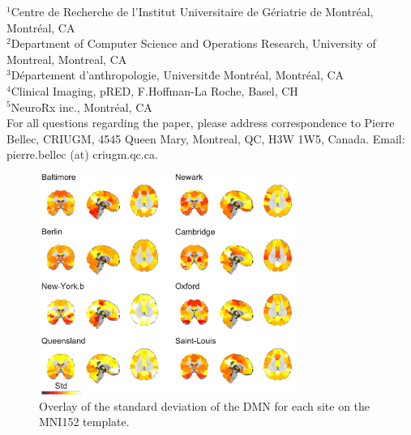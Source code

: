 \documentclass[authoryear]{elsarticle}
\begin{document}
$^1$Centre de Recherche de l'Institut Universitaire de G\'eriatrie de Montr\'eal, Montr\'eal, CA\\
$^2$Department of Computer Science and Operations Research, University of Montreal, Montreal, CA\\
$^3$D\'epartement d'anthropologie, Universit\' de Montr\'eal, Montr\'eal, CA\\
$^4$Clinical Imaging, pRED, F.Hoffman-La Roche, Basel, CH\\
$^5$NeuroRx inc., Montr\'eal, CA\\

For all questions regarding the paper, please address correspondence to Pierre Bellec, CRIUGM, 4545 Queen Mary, Montreal, QC, H3W 1W5, Canada. Email: pierre.bellec (at) criugm.qc.ca.\\


\begin{figure}[htbp]
\centering
\includegraphics[width=0.75\textwidth]{../figures/dmn_stdmultisite.pdf}
\caption[]{
Overlay of the standard deviation of the DMN for each site on the MNI152 template.
}
\label{fig_std_DMNs}
\end{figure}
\end{document}
